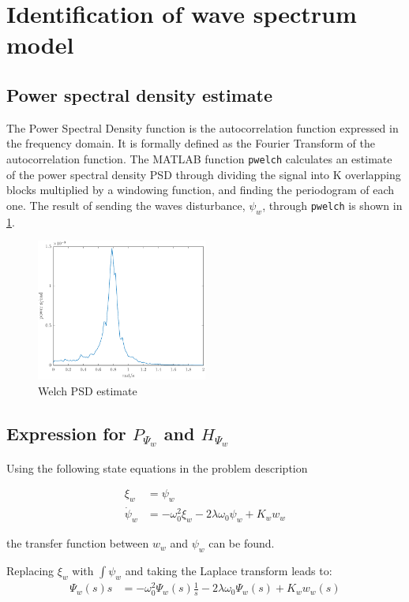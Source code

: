 \section{Identification of wave spectrum model}
\subsection{Power spectral density estimate}
The Power Spectral Density function is the autocorrelation function expressed in the frequency domain. It is formally defined as the Fourier Transform of the autocorrelation function.  The MATLAB function \texttt{pwelch} calculates an estimate of the power spectral density PSD through
dividing the signal into K overlapping blocks multiplied by a windowing function, and finding the periodogram of each one.  The result of sending the waves disturbance, $\psi_w$, through \texttt{pwelch} is shown in \cref{fig:2a-welchPSDestimate}.

\begin{figure}[h]
    \centering
    \includegraphics[width=0.5\textwidth]{images/2a-welchPSDestimate}
    \caption{Welch PSD estimate}
    \label{fig:2a-welchPSDestimate}
\end{figure}

\subsection{Expression for $P_{\Psi_{w}}$ and $H_{\Psi_{w}}$}
Using the following state equations in the problem description \cite{assignment}

\begin{align*}
    \xi_w &= \psi_w \\
    \dot{\psi}_w &= -\omega^2_0\xi_w - 2\lambda\omega_0\psi_w + K_ww_w
\end{align*}

the transfer function between $w_w$ and $\psi_w$ can be found.

Replacing $\xi_w$ with $\int\psi_w$ and taking the Laplace transform leads to:
\begin{align*}
    \Psi_w(s)s &= -\omega^2_0\Psi_w(s)\frac{1}{s} - 2\lambda\omega_0\Psi_w(s) + K_ww_w(s)
\end{align*}

